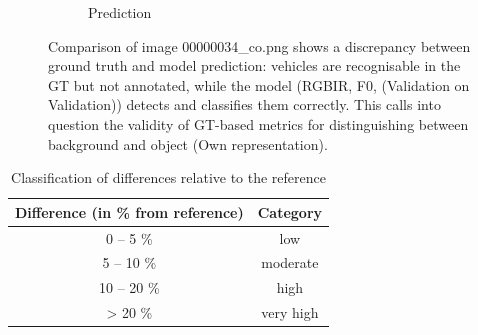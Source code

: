 \begin{figure}[h]
\begin{subfigure}[b]{0.45\textwidth}
        \caption{Prediction} %
        \label{fig:cm_irgb} %
    \end{subfigure}
    \caption{Comparison of image 00000034\_co.png shows a discrepancy between ground truth and model prediction: vehicles are recognisable in the GT but not annotated, while the model (RGBIR, F0, (Validation on Validation)) detects and classifies them correctly. This calls into question the validity of GT-based metrics for distinguishing between background and object (Own representation).} %
    \label{fig:wrong_labels} %
\end{figure}


\begin{table}[h]
\centering
\begin{tabular}{c c}
\hline
\textbf{Difference (in \% from reference)} & \textbf{Category} \\ \hline
0 -- 5 \%   & low \\ 
5 -- 10 \%  & moderate \\ 
10 -- 20 \% & high \\ 
> 20 \%     & very high \\ \hline
\end{tabular}
\caption{Classification of differences relative to the reference}
\label{tab:diff_cat}
\end{table}

